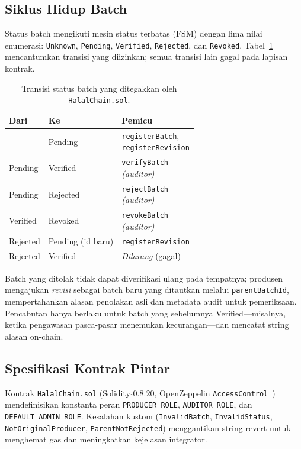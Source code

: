 \subsection{Siklus Hidup Batch}
Status batch mengikuti mesin status terbatas (FSM) dengan lima nilai enumerasi: \texttt{Unknown}, \texttt{Pending}, \texttt{Verified}, \texttt{Rejected}, dan \texttt{Revoked}.
Tabel~\ref{tab:fsm} mencantumkan transisi yang diizinkan; semua transisi lain gagal pada lapisan kontrak.

\begin{table}[t]
  \caption{Transisi status batch yang ditegakkan oleh \texttt{HalalChain.sol}.}
  \label{tab:fsm}
  \centering
  \footnotesize
  \setlength{\tabcolsep}{3pt}
  \begin{tabularx}{\columnwidth}{@{}>{\raggedright\arraybackslash}p{}>{\raggedright\arraybackslash}p{}>{\raggedright\arraybackslash}X@{}}
    \toprule
    \textbf{Dari} & \textbf{Ke} & \textbf{Pemicu} \\
    \midrule
    --- & Pending & \makecell[tl]{\texttt{registerBatch},\\\texttt{registerRevision}} \\
    Pending & Verified & \makecell[tl]{\texttt{verifyBatch}\\\textit{(auditor)}} \\
    Pending & Rejected & \makecell[tl]{\texttt{rejectBatch}\\\textit{(auditor)}} \\
    Verified & Revoked & \makecell[tl]{\texttt{revokeBatch}\\\textit{(auditor)}} \\
    Rejected & Pending (id baru) & \texttt{registerRevision} \\
    Rejected & Verified & \emph{Dilarang} (gagal) \\
    \bottomrule
  \end{tabularx}
\end{table}

Batch yang ditolak tidak dapat diverifikasi ulang pada tempatnya; produsen mengajukan \emph{revisi} sebagai batch baru yang ditautkan melalui \texttt{parentBatchId}, mempertahankan alasan penolakan asli dan metadata audit untuk pemeriksaan.
Pencabutan hanya berlaku untuk batch yang sebelumnya Verified---misalnya, ketika pengawasan pasca-pasar menemukan kecurangan---dan mencatat string alasan on-chain.

\subsection{Spesifikasi Kontrak Pintar}
Kontrak \texttt{HalalChain.sol} (Solidity ${\hat{}}0.8.20$, OpenZeppelin \texttt{AccessControl}~\cite{openzeppelin2024access}) mendefinisikan konstanta peran \texttt{PRODUCER\_ROLE}, \texttt{AUDITOR\_ROLE}, dan \texttt{DEFAULT\_ADMIN\_ROLE}.
Kesalahan kustom (\texttt{InvalidBatch}, \texttt{InvalidStatus}, \texttt{NotOriginalProducer}, \texttt{ParentNotRejected}) menggantikan string revert untuk menghemat gas dan meningkatkan kejelasan integrator.

